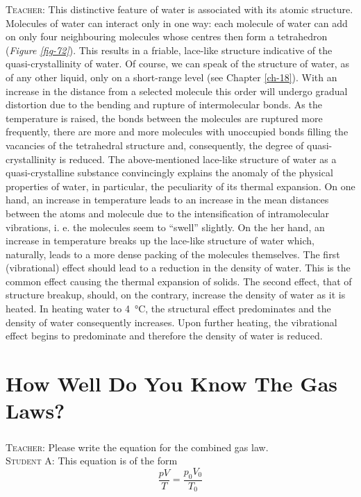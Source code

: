 \documentclass[a4paper,sfsidenotes]{tufte-book}
\begin{document}
\textsc{Teacher:} This distinctive feature of water is associated with its atomic structure. Molecules
of water can interact only in one way: each molecule of water can add on only four neighbouring
molecules whose centres then form a tetrahedron (\emph{Figure \ref{fig-72}}). This results in a friable, lace-like structure indicative of the quasi-crystallinity of water. Of course, we can speak of the structure of water, as of any other liquid, only on a short-range level (see  Chapter \ref{ch-18}). With an increase in the distance from
a selected molecule this order will undergo gradual distortion due to the bending and rupture of intermolecular bonds. As the temperature is raised, the bonds between the molecules are ruptured more frequently, there are more and more molecules with unoccupied bonds filling the vacancies of
the tetrahedral structure and, consequently, the degree of quasi-crystallinity is reduced. The above-mentioned lace-like structure of water as a quasi-crystalline substance convincingly explains the anomaly of the physical properties of water, in particular, the peculiarity of its thermal expansion. On one hand, an increase in temperature leads to an increase in the mean distances between the atoms
and molecule due to the intensification of intramolecular vibrations, i. e. the molecules seem to ``swell'' slightly. On the her hand, an increase in temperature breaks up the lace-like structure of water which, naturally, leads to a more dense packing of the molecules themselves. The first (vibrational) effect should lead to a reduction in the density of water. This is the common effect causing the thermal expansion of solids. The second effect, that of structure breakup, should, on the contrary, increase the density of water as it is heated. In heating water to \SI{4}{\degreeCelsius}, the structural effect predominates and the density of water consequently increases. Upon further heating, the vibrational effect begins to predominate and
therefore the density of water is reduced.

\chapter{How Well Do You Know The Gas Laws?}
\label{ch-20}

\paragraph{}
\indent
\textsc{Teacher:} Please write the equation for the combined gas law.
\\
\textsc{Student A:} This equation is of the form
\begin{equation}%
\frac{pV}{T} = \frac{p_{0}V_{0}}{T_{0}}
\label{eq-103}
\end{equation}
\end{document}
